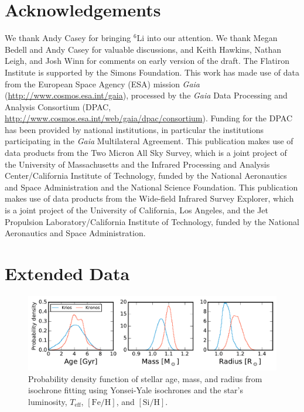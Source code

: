 \documentclass[12pt,letterpaper,margin=1in]{article}
\newcommand*\elem[1]{\ensuremath{\mathrm{#1}}}
\newcommand*\elemH[1]{\ensuremath{[\mathrm{#1}/\elem{H}]}}
\newcommand*\teff{\ensuremath{T_\mathrm{eff}}}
\newcommand*{\feh}{\ensuremath{\elemH{Fe}}}
\begin{document}
\section{Acknowledgements}
We thank Andy Casey for bringing $^{6}\elem{Li}$ into our attention.
We thank Megan Bedell and Andy Casey for valuable discussions,
and Keith Hawkins, Nathan Leigh, and Josh Winn for comments
on early version of the draft.
The Flatiron Institute is supported by the Simons Foundation.
This work has made use of data from the European Space Agency (ESA) mission
{\it Gaia} (\url{http://www.cosmos.esa.int/gaia}), processed by the {\it Gaia}
Data Processing and Analysis Consortium (DPAC,
\url{http://www.cosmos.esa.int/web/gaia/dpac/consortium}). Funding for the DPAC
has been provided by national institutions, in particular the institutions
participating in the {\it Gaia} Multilateral Agreement.
This publication makes use of data products from the Two Micron All Sky Survey,
which is a joint project of the University of Massachusetts and the Infrared
Processing and Analysis Center/California Institute of Technology, funded by
the National Aeronautics and Space Administration and the National Science
Foundation.
This publication makes use of data products from the Wide-field Infrared Survey
Explorer, which is a joint project of the University of California, Los
Angeles, and the Jet Propulsion Laboratory/California Institute of Technology,
funded by the National Aeronautics and Space Administration.


\section{Extended Data}

\begin{figure}[htpb]
  \centering
  \includegraphics[width=0.95\linewidth]{yyisofitting.pdf}
  \caption{Probability density function of stellar age, mass, and radius
    from isochrone fitting using Yonsei-Yale isochrones\cite{2013ApJ...776...87S}
    and the star's luminosity, \teff, \feh, and \elemH{Si}.
  }
  \label{fig:yyisofitting}
\end{figure}
\end{document}

